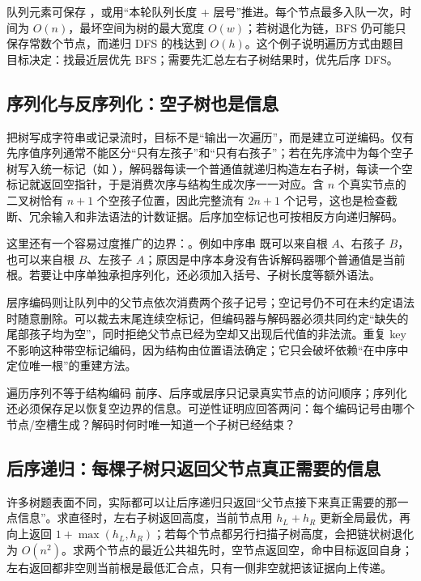 \documentclass[UTF8,fontset=none,11pt,a4paper]{ctexart}
\begin{document}
队列元素可保存 ，或用“本轮队列长度 + 层号”推进。每个节点最多入队一次，时间为 $O(n)$，最坏空间为树的最大宽度 $O(w)$；若树退化为链，BFS 仍可能只保存常数个节点，而递归 DFS 的栈达到 $O(h)$。这个例子说明遍历方式由题目目标决定：找最近层优先 BFS；需要先汇总左右子树结果时，优先后序 DFS。

\subsection{序列化与反序列化：空子树也是信息}
把树写成字符串或记录流时，目标不是“输出一次遍历”，而是建立可逆编码。仅有先序值序列通常不能区分“只有左孩子”和“只有右孩子”；若在先序流中为每个空子树写入统一标记（如 \code{\#}），解码器每读一个普通值就递归构造左右子树，每读一个空标记就返回空指针，于是消费次序与结构生成次序一一对应。含 $n$ 个真实节点的二叉树恰有 $n+1$ 个空孩子位置，因此完整流有 $2n+1$ 个记号，这也是检查截断、冗余输入和非法语法的计数证据。后序加空标记也可按相反方向递归解码。

这里还有一个容易过度推广的边界：。例如中序串  既可以来自根 $A$、右孩子 $B$，也可以来自根 $B$、左孩子 $A$；原因是中序本身没有告诉解码器哪个普通值是当前根。若要让中序单独承担序列化，还必须加入括号、子树长度等额外语法。

层序编码则让队列中的父节点依次消费两个孩子记号；空记号仍不可在未约定语法时随意删除。可以裁去末尾连续空标记，但编码器与解码器必须共同约定“缺失的尾部孩子均为空”，同时拒绝父节点已经为空却又出现后代值的非法流。重复 key 不影响这种带空标记编码，因为结构由位置语法确定；它只会破坏依赖“在中序中定位唯一根”的重建方法。

\begin{warnbox}{遍历序列不等于结构编码}
前序、后序或层序只记录真实节点的访问顺序；序列化还必须保存足以恢复空边界的信息。可逆性证明应回答两问：每个编码记号由哪个节点/空槽生成？解码时何时唯一知道一个子树已经结束？
\end{warnbox}

\subsection{后序递归：每棵子树只返回父节点真正需要的信息}
许多树题表面不同，实际都可以让后序递归只返回“父节点接下来真正需要的那一点信息”。求直径时，左右子树返回高度，当前节点用 $h_L+h_R$ 更新全局最优，再向上返回 $1+\max(h_L,h_R)$；若每个节点都另行扫描子树高度，会把链状树退化为 $O(n^2)$。求两个节点的最近公共祖先时，空节点返回空，命中目标返回自身；左右返回都非空则当前根是最低汇合点，只有一侧非空就把该证据向上传递。
\end{document}
